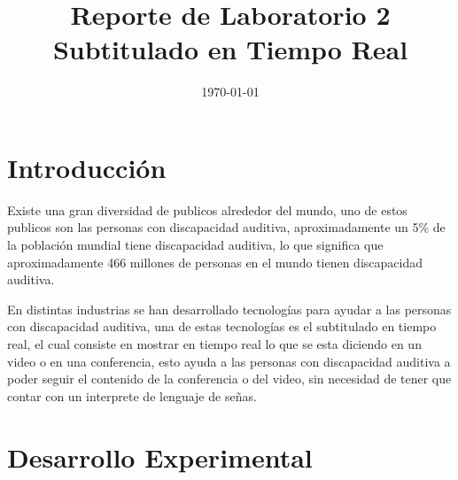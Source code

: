 \documentclass[conference]{IEEEtran}
\date{\specialdate\today}
\begin{document}
\newcommand{\breite}{0.9} %
\newcommand{\RelacionFiguradoscolumnas}{0.9}
\newcommand{\RelacionFiguradoscolumnasPuntoCinco}{0.45}

\title{Reporte de Laboratorio 2 \\ Subtitulado en Tiempo Real}

\author{
}

\maketitle

\begin{abstract} 

\end{abstract}

\section{Introducción}
Existe una gran diversidad de publicos alrededor del mundo, uno de estos publicos son las personas con discapacidad auditiva, aproximadamente un 5\% de la población mundial tiene discapacidad auditiva, lo que significa que aproximadamente 466 millones de personas en el mundo tienen discapacidad auditiva. \cite{OMS}

En distintas industrias se han desarrollado tecnologías para ayudar a las personas con discapacidad auditiva, una de estas tecnologías es el subtitulado en tiempo real, el cual consiste en mostrar en tiempo real lo que se esta diciendo en un video o en una conferencia, esto ayuda a las personas con discapacidad auditiva a poder seguir el contenido de la conferencia o del video, sin necesidad de tener que contar con un interprete de lenguaje de señas.

\section{Desarrollo Experimental}
\end{document}
